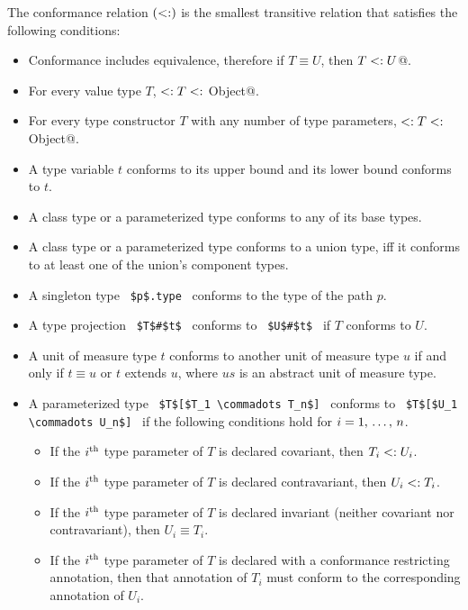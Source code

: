 The conformance relation $(<:)$ is the smallest transitive relation that satisfies the following conditions:

\begin{itemize}

\item
Conformance includes equivalence, therefore if $T \equiv U$, then \lstinline@$T <: U$@. 

\item
For every value type $T$, \lstinline@Nothing $<: T <:$ Object@. 

\item
For every type constructor $T$ with any number of type parameters, \lstinline@Nothing $<: T <:$ Object@. 

\item
A type variable $t$ conforms to its upper bound and its lower bound conforms to $t$. 

\item
A class type or a parameterized type conforms to any of its base types. 

\item
A class type or a parameterized type conforms to a union type, iff it conforms to at least one of the union's component types. 

\item 
A singleton type ~\lstinline!$p$.type!~ conforms to the type of the path $p$.

\item
A type projection ~\lstinline!$T$#$t$!~ conforms to ~\lstinline!$U$#$t$!~ if $T$ conforms to $U$. 

\item
A unit of measure type $t$ conforms to another unit of measure type $u$ if and only if $t \equiv u$ or $t$ extends $u$, where $us$ is an abstract unit of measure type. 

\item 
A parameterized type ~\lstinline!$T$[$T_1 \commadots T_n$]!~ conforms to ~\lstinline!$T$[$U_1 \commadots U_n$]!~ if the following conditions hold for $i = 1 ,\, \ldots ,\, n$.
\begin{itemize}
\item If the $i^{\mbox{\scriptsize th}}$ type parameter of $T$ is declared covariant, then $T_i <: U_i$.
\item If the $i^{\mbox{\scriptsize th}}$ type parameter of $T$ is declared contravariant, then $U_i <: T_i$.
\item If the $i^{\mbox{\scriptsize th}}$ type parameter of $T$ is declared invariant (neither covariant nor contravariant), then $U_i \equiv T_i$.
\item If the $i^{\mbox{\scriptsize th}}$ type parameter of $T$ is declared with a conformance restricting annotation, then that annotation of $T_i$ must conform to the corresponding annotation of $U_i$. 
\end{itemize}


\end{itemize}
